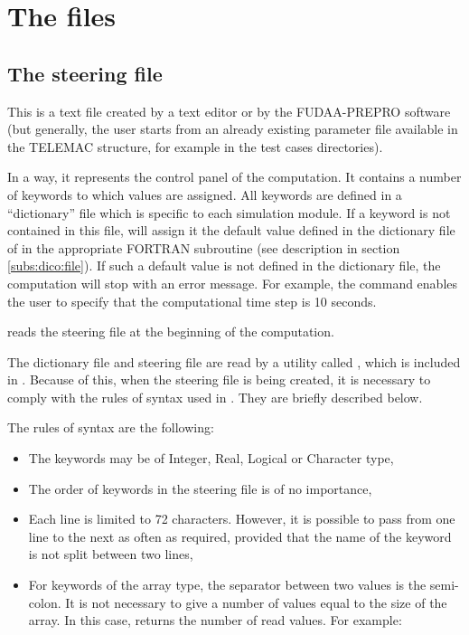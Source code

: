 \section{The files}


\subsection{The steering file}

This is a text file created by a text editor or by the FUDAA-PREPRO software
(but generally, the user starts from an already existing parameter file available
in the TELEMAC structure, for example in the test cases directories).

In a way, it represents the control panel of the computation.
It contains a number of keywords to which values are assigned.
All keywords are defined in a ``dictionary'' file which is specific to each
simulation module.
If a keyword is not contained in this file,  will assign it
the default value defined in the dictionary file of in the appropriate FORTRAN
subroutine (see description in section \ref{subs:dico:file}).
If such a default value is not defined in the dictionary file,
the computation will stop with an error message.
For example, the command  enables the user to specify
that the computational time step is 10 seconds.

 reads the steering file at the beginning of the computation.

The dictionary file and steering file are read by a utility called \damo,
which is included in \tel.
Because of this, when the steering file is being created, it is necessary
to comply with the rules of syntax used in \damo.
They are briefly described below.

The rules of syntax are the following:

\begin{itemize}
\item The keywords may be of Integer, Real, Logical or Character type,

\item The order of keywords in the steering file is of no importance,

\item Each line is limited to 72 characters.
However, it is possible to pass from one line to the next as often as required,
provided that the name of the keyword is not split between two lines,

\item For keywords of the array type, the separator between two values is the
semi-colon.
It is not necessary to give a number of values equal to the size of the array.
In this case, \damo returns the number of read values. For example:
\end{itemize}


